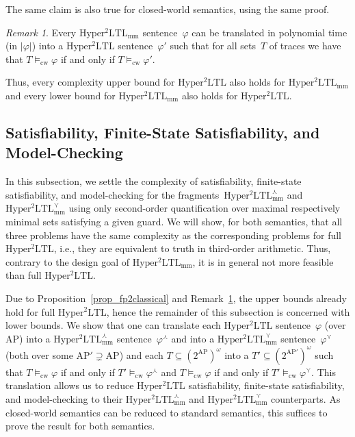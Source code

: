 \documentclass[dvipsnames,10pt,a4paper]{amsart}
\theoremstyle{definition}
\theoremstyle{remark}
\newtheorem{rem}[thm]{Remark}
\renewcommand{\phi}{\varphi}
\newcommand{\size}[1]{|#1|}
\newcommand{\pow}[1]{2^{#1}}
\newcommand{\sohyltl}{\mathrm{Hyper^2LTL}\xspace}
\newcommand{\sohyltlfp}{\mathrm{Hyper^2LTL_{\mathrm{mm}}}\xspace}
\newcommand{\sohyltlfpmax}{\mathrm{Hyper^2LTL_{\mathrm{mm}}^{\largest}}\xspace}
\newcommand{\sohyltlfpmin}{\mathrm{Hyper^2LTL_{\mathrm{mm}}^{\smallest}}\xspace}
\newcommand{\ap}[0]{\mathrm{AP}}
\newcommand{\smallest}{\curlyvee}
\newcommand{\largest}{\curlywedge}
\newcommand{\cw}{\mathrm{cw}}
\begin{document}
The same claim is also true for closed-world semantics, using the same proof.

\begin{rem}
\label{remark_fp2classical_cw}
Every $\sohyltlfp$ sentence~$\phi$ can be translated in polynomial time (in $\size{\varphi}$) into a $\sohyltl$ sentence~$\phi'$ such that for all sets~$T$ of traces we have that $T \models_\cw \phi$  if and only if  $T \models_\cw \phi'$.
\end{rem}

Thus, every complexity upper bound for $\sohyltl$ also holds for $\sohyltlfp$ and every lower bound for $\sohyltlfp$ also holds for $\sohyltl$.


\subsection{Satisfiability, Finite-State Satisfiability, and Model-Checking} 

In this subsection, we settle the complexity of satisfiability, finite-state satisfiability, and model-checking for the fragments~$\sohyltlfpmax$ and $\sohyltlfpmin$ using only second-order quantification over maximal respectively minimal sets satisfying a given guard.
We will show, for both semantics, that all three problems have the same complexity as the corresponding problems for full $\sohyltl$, i.e., they are equivalent to truth in third-order arithmetic.
Thus, contrary to the design goal of $\sohyltlfp$, it is in general not more feasible than full $\sohyltl$.

Due to Proposition~\ref{prop_fp2classical} and Remark~\ref{remark_fp2classical_cw}, the upper bounds already hold for full $\sohyltl$, hence the remainder of this subsection is concerned with lower bounds. 
We show that one can translate each $\sohyltl$ sentence~$\phi$ (over $\ap$) into a $\sohyltlfpmax$ sentence~$\phi^\largest$ and into a $\sohyltlfpmin$ sentence~$\phi^\smallest$ (both over some $\ap' \supsetneq \ap$) and each $T \subseteq (\pow{\ap})^\omega$ into a $T' \subseteq (\pow{\ap'})^\omega$ such that $T\models_\cw \phi$ if and only if $T'\models_\cw \phi^\largest$ and $T\models_\cw \phi$ if and only if $T'\models_\cw \phi^\smallest$.
This translation allows us to reduce $\sohyltl$ satisfiability, finite-state satisfiability, and model-checking to their $\sohyltlfpmax$ and $\sohyltlfpmin$ counterparts.
As closed-world semantics can be reduced to standard semantics, this suffices to prove the result for both semantics.
\end{document}
